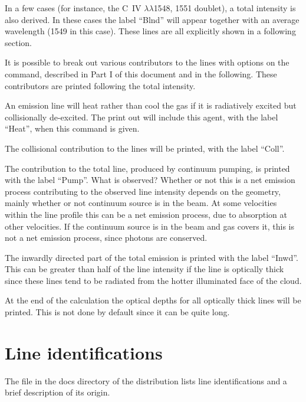 In a few cases (for instance, the C~IV $\lambda \lambda $1548, 1551 doublet), a total
intensity is also derived.
In these cases the label ``Blnd'' will appear
together with an average wavelength (1549 in this case).
These lines are
all explicitly shown in a following section.

It is possible to break out various contributors to the lines with options
on the  command, described in Part I of this document and in the
following.
These contributors are printed following the total intensity.

  An emission line will heat
rather than cool the gas
if it is radiatively excited but collisionally de-excited.
The print out
will include this agent, with the label ``Heat'',
when this command is given.

  The collisional contribution
to the lines will
be printed, with the label ``Coll''.

  The contribution to the total line, produced by continuum
pumping, is printed with the label ``Pump''.   What is observed?  Whether
or not this is a net emission process contributing to the observed line
intensity depends on the geometry, mainly whether or not continuum source
is in the beam. At some velocities within the line profile this can be a
net emission process, due to absorption at other velocities.   If the
continuum source is in the beam and gas covers it, this is not a net emission
process, since photons are conserved.

  The inwardly directed part of the total emission is
printed with the label ``Inwd''.  This can be greater than half of the line
intensity if the line is optically thick since these lines tend to be
radiated from the hotter illuminated face of the cloud.

  At the end of the calculation the optical
depths for all optically thick lines will be printed.
This is not done
by default since it can be quite long.

\section{Line identifications}

The file  in the docs directory of the distribution lists
line identifications and a brief description of its origin.

